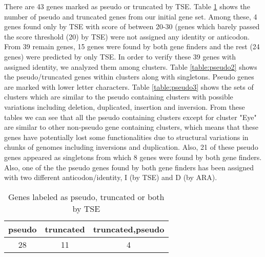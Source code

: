 \documentclass[table,
12pt, %
a4paper, %
oneside, %
headinclude,footinclude, %
BCOR5mm, %
]{scrartcl}
\begin{document}
There are 43 genes marked as pseudo or truncated by TSE. Table \ref{table:pseudo1} shows the number of pseudo and truncated genes from our initial gene set. Among these, 4 genes found only by TSE with score of between 20-30 (genes which barely passed the score threshold (20) by TSE) were not assigned any identity or anticodon. From 39 remain genes, 15 genes were found by both gene finders and the rest (24 genes) were predicted by only TSE. In order to verify these 39 genes with assigned identity, we analyzed them among clusters. Table \ref{table:pseudo2} shows the pseudo/truncated genes within clusters along with singletons. Pseudo genes are marked with lower letter characters. Table \ref{table:pseudo3} shows the sets of clusters which are similar to the  pseudo containing clusters with possible variations including deletion, duplicated, insertion and inversion. From these tables we can see that all the pseudo containing clusters except for cluster "Eye" are similar to other non-pseudo gene containing clusters, which means that these genes have potentially lost some functionalities due to structural variations in chunks of genomes including inversions and duplication. Also, 21 of these pseudo genes appeared as singletons from which 8 genes were found by both gene finders. Also, one of the the pseudo genes found by both gene finders has been assigned with two different anticodon/identity, I (by TSE) and D (by ARA).


\begin{table}[htbp]
  \caption{Genes labeled as pseudo, truncated or both by TSE}
  \begin{adjustbox}{width=7cm,center}
    \begin{tabular}{|c||c||c|}
      \hline
      pseudo & truncated & truncated,pseudo \\
      \hline
      28     & 11        & 4                \\
      \hline
    \end{tabular}
    \label{table:pseudo1}
  \end{adjustbox}
\end{table}
\end{document}
